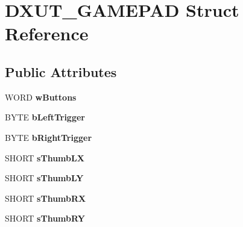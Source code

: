 \hypertarget{struct_d_x_u_t___g_a_m_e_p_a_d}{\section{D\+X\+U\+T\+\_\+\+G\+A\+M\+E\+P\+A\+D Struct Reference}
\label{struct_d_x_u_t___g_a_m_e_p_a_d}
}
\subsection*{Public Attributes}
\begin{DoxyCompactItemize}
\item 
\hypertarget{struct_d_x_u_t___g_a_m_e_p_a_d_a1702c0bfaef670a3e369c19e76bd1365}{W\+O\+R\+D {\bfseries w\+Buttons}}\label{struct_d_x_u_t___g_a_m_e_p_a_d_a1702c0bfaef670a3e369c19e76bd1365}

\item 
\hypertarget{struct_d_x_u_t___g_a_m_e_p_a_d_afad6b4182e7931e91b32609421f49354}{B\+Y\+T\+E {\bfseries b\+Left\+Trigger}}\label{struct_d_x_u_t___g_a_m_e_p_a_d_afad6b4182e7931e91b32609421f49354}

\item 
\hypertarget{struct_d_x_u_t___g_a_m_e_p_a_d_aeb5863b24560130cbdad6f78701bffa3}{B\+Y\+T\+E {\bfseries b\+Right\+Trigger}}\label{struct_d_x_u_t___g_a_m_e_p_a_d_aeb5863b24560130cbdad6f78701bffa3}

\item 
\hypertarget{struct_d_x_u_t___g_a_m_e_p_a_d_a5239a39fa77f6bfafc450d28e1a4093f}{S\+H\+O\+R\+T {\bfseries s\+Thumb\+L\+X}}\label{struct_d_x_u_t___g_a_m_e_p_a_d_a5239a39fa77f6bfafc450d28e1a4093f}

\item 
\hypertarget{struct_d_x_u_t___g_a_m_e_p_a_d_acbfdf3ef4e244cdc704b6b650445c174}{S\+H\+O\+R\+T {\bfseries s\+Thumb\+L\+Y}}\label{struct_d_x_u_t___g_a_m_e_p_a_d_acbfdf3ef4e244cdc704b6b650445c174}

\item 
\hypertarget{struct_d_x_u_t___g_a_m_e_p_a_d_a7bf9e0a51d076380d372297c6ea2d8ca}{S\+H\+O\+R\+T {\bfseries s\+Thumb\+R\+X}}\label{struct_d_x_u_t___g_a_m_e_p_a_d_a7bf9e0a51d076380d372297c6ea2d8ca}

\item 
\hypertarget{struct_d_x_u_t___g_a_m_e_p_a_d_adbe2348a62eff5447e97210b747e700a}{S\+H\+O\+R\+T {\bfseries s\+Thumb\+R\+Y}}\label{struct_d_x_u_t___g_a_m_e_p_a_d_adbe2348a62eff5447e97210b747e700a}


\end{DoxyCompactItemize}
